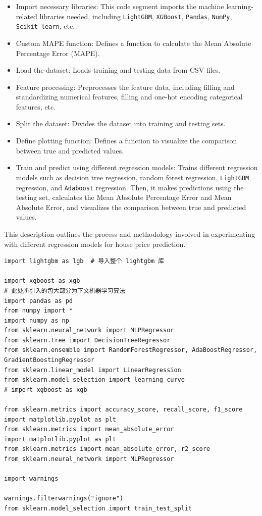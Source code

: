 \documentclass[a4paper,12pt]{article}
\begin{document}
\begin{itemize}
    \item Import necessary libraries: This code segment imports the machine learning-related libraries needed, including \texttt{LightGBM}, \texttt{XGBoost}, \texttt{Pandas}, \texttt{NumPy}, \texttt{Scikit-learn}, etc.
    
    \item Custom MAPE function: Defines a function to calculate the Mean Absolute Percentage Error (MAPE).
    
    \item Load the dataset: Loads training and testing data from CSV files.
    
    \item Feature processing: Preprocesses the feature data, including filling and standardizing numerical features, filling and one-hot encoding categorical features, etc.
    
    \item Split the dataset: Divides the dataset into training and testing sets.
    
    \item Define plotting function: Defines a function to visualize the comparison between true and predicted values.
    
    \item Train and predict using different regression models: Trains different regression models such as decision tree regression, random forest regression, \texttt{LightGBM} regression, and \texttt{Adaboost} regression. Then, it makes predictions using the testing set, calculates the Mean Absolute Percentage Error and Mean Absolute Error, and visualizes the comparison between true and predicted values.
\end{itemize} 

This description outlines the process and methodology involved in experimenting with different regression models for house price prediction.

\begin{lstlisting}
import lightgbm as lgb  # 导入整个 lightgbm 库

import xgboost as xgb
# 此处所引入的包大部分为下文机器学习算法
import pandas as pd
from numpy import *
import numpy as np
from sklearn.neural_network import MLPRegressor
from sklearn.tree import DecisionTreeRegressor
from sklearn.ensemble import RandomForestRegressor, AdaBoostRegressor, GradientBoostingRegressor
from sklearn.linear_model import LinearRegression
from sklearn.model_selection import learning_curve
# import xgboost as xgb

from sklearn.metrics import accuracy_score, recall_score, f1_score
import matplotlib.pyplot as plt
from sklearn.metrics import mean_absolute_error
import matplotlib.pyplot as plt
from sklearn.metrics import mean_absolute_error, r2_score
from sklearn.neural_network import MLPRegressor

import warnings

warnings.filterwarnings("ignore")
from sklearn.model_selection import train_test_split
\end{lstlisting}
\end{document}
